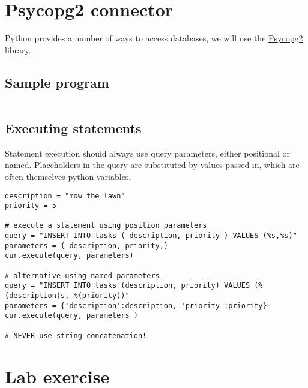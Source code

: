 \section{Psycopg2 connector}
\label{sec:psycopg2-connector}

Python provides a number of ways to access databases, we will use the
\href{https://www.psycopg.org}{Psycopg2} library.

\subsection{Sample program}

\inputminted{python}{connectivity_example.py}

\subsection{Executing statements}
\label{sec:executing-statements}

Statement execution should always use query parameters, either positional or named.
Placeholders in the query are substituted by values passed in, which are often themselves python variables.

\begin{verbatim}
description = "mow the lawn"
priority = 5

# execute a statement using position parameters
query = "INSERT INTO tasks ( description, priority ) VALUES (%s,%s)"
parameters = ( description, priority,) 
cur.execute(query, parameters)

# alternative using named parameters
query = "INSERT INTO tasks (description, priority) VALUES (%(description)s, %(priority))"
parameters = {'description':description, 'priority':priority}
cur.execute(query, parameters )

# NEVER use string concatenation!
\end{verbatim}


\section{Lab exercise}


